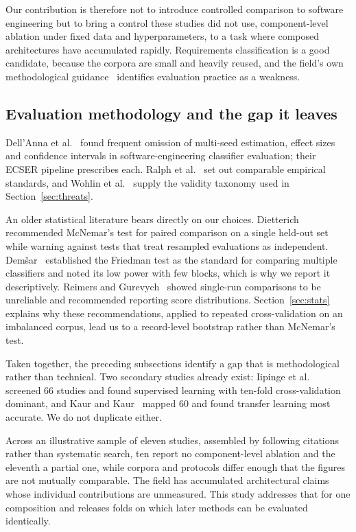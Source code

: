 \documentclass[11pt,a4paper]{article}
\begin{document}
Our contribution is therefore not to introduce controlled comparison to software engineering
but to bring a control these studies did not use, component-level ablation under fixed data
and hyperparameters, to a task where composed architectures have accumulated rapidly.
Requirements classification is a good candidate, because the corpora are small and heavily reused,
and the field's own methodological guidance~\cite{dellanna2023} identifies evaluation
practice as a weakness.

\subsection{Evaluation methodology and the gap it leaves}
\label{sec:rw-eval}

Dell'Anna et al.~\cite{dellanna2023} found frequent omission of multi-seed estimation, effect sizes and
confidence intervals in software-engineering classifier evaluation; their ECSER pipeline prescribes each.
Ralph et al.~\cite{ralph2020} set out comparable empirical standards, and Wohlin et al.~\cite{wohlin2012}
supply the validity taxonomy used in Section~\ref{sec:threats}.

An older statistical literature bears directly on our choices.
Dietterich~\cite{dietterich1998} recommended McNemar's test for paired comparison on a single
held-out set while warning against tests that treat resampled evaluations as independent.
Demšar~\cite{demsar2006} established the Friedman test as the standard for comparing multiple
classifiers and noted its low power with few blocks, which is why we report it descriptively.
Reimers and Gurevych~\cite{reimers2017} showed single-run comparisons to be unreliable and
recommended reporting score distributions. Section~\ref{sec:stats} explains why these
recommendations, applied to repeated cross-validation on an imbalanced corpus, lead us to a
record-level bootstrap rather than McNemar's test.

\medskip
\noindent
Taken together, the preceding subsections identify a gap that is methodological rather than
technical. Two secondary studies already exist: Iipinge et al.~\cite{iipinge2023} screened 66 studies and
found supervised learning with ten-fold cross-validation dominant, and Kaur and
Kaur~\cite{kaur2024} mapped 60 and found transfer learning most accurate. We do not duplicate
either.



Across an illustrative sample of eleven studies, assembled by following citations rather than
systematic search, ten report no component-level ablation and the eleventh a partial one, while
corpora and protocols differ enough that the figures are not mutually comparable. The field has
accumulated architectural claims whose individual contributions are unmeasured. This study
addresses that for one composition and releases folds on which later methods can be evaluated
identically.
\end{document}
